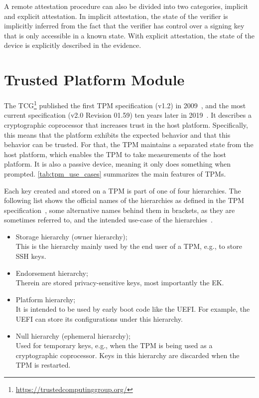 A remote attestation procedure can also be divided into two categories, implicit and explicit attestation.
In implicit attestation, the state of the verifier is implicitly inferred from the fact that the verifier has control over a signing key that is only accessible in a known state.
With explicit attestation, the state of the device is explicitly described in the evidence.

\section{Trusted Platform Module}\label{sec:tpm}

The \ac{TCG}\footnote{\url{https://trustedcomputinggroup.org/}} published the first TPM specification (v1.2) in 2009~\cite{ISO11889}, and the most current specification (v2.0 Revision 01.59) ten years later in 2019~\cite{tpm}.
It describes a cryptographic coprocessor that increases trust in the host platform. Specifically, this means that the platform exhibits the expected behavior and that this behavior can be trusted.
For that, the TPM maintains a separated state from the host platform, which enables the TPM to take measurements of the host platform.
It is also a passive device, meaning it only does something when prompted.
\autoref{tab:tpm_use_cases} summarizes the main features of TPMs.



Each key created and stored on a TPM is part of one of four hierarchies.
The following list shows the official names of the hierarchies as defined in the TPM specification~\cite{tpm}, some alternative names behind them in brackets, as they are sometimes referred to, and the intended use-case of the hierarchies~\cite{Arthur2015}.
\begin{itemize}

  \item{Storage hierarchy (owner hierarchy);\\
  This is the hierarchy mainly used by the end user of a TPM, e.g., to store SSH keys.}

  \item{Endorsement hierarchy;\\
  Therein are stored privacy-sensitive keys, most importantly the EK.}

  \item{Platform hierarchy;\\
  It is intended to be used by early boot code like the UEFI\@.
  For example, the UEFI can store its configurations under this hierarchy.}

  \item{Null hierarchy (ephemeral hierarchy);\\
  Used for temporary keys, e.g., when the TPM is being used as a cryptographic coprocessor.
  Keys in this hierarchy are discarded when the TPM is restarted.}

\end{itemize}


